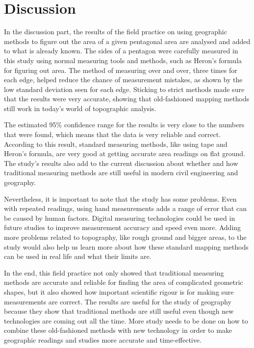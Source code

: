 \documentclass[12pt]{report}
\begin{document}
\newpage
\section*{Discussion}


In the discussion part, the results of the field practice on using geographic methods to figure out the area of a given pentagonal area are analysed and added to what is already known. The sides of a pentagon were carefully measured in this study using normal measuring tools and methods, such as Heron's formula for figuring out area. The method of measuring over and over, three times for each edge, helped reduce the chance of measurement mistakes, as shown by the low standard deviation seen for each edge. Sticking to strict methods made sure that the results were very accurate, showing that old-fashioned mapping methods still work in today's world of topographic analysis.

The estimated 95\% confidence range for the results is very close to the numbers that were found, which means that the data is very reliable and correct. According to this result, standard measuring methods, like using tape and Heron's formula, are very good at getting accurate area readings on flat ground. The study's results also add to the current discussion about whether and how traditional measuring methods are still useful in modern civil engineering and geography.

Nevertheless, it is important to note that the study has some problems. Even with repeated readings, using hand measurements adds a range of error that can be caused by human factors. Digital measuring technologies could be used in future studies to improve measurement accuracy and speed even more. Adding more problems related to topography, like rough ground and bigger areas, to the study would also help us learn more about how these standard mapping methods can be used in real life and what their limits are.

In the end, this field practice not only showed that traditional measuring methods are accurate and reliable for finding the area of complicated geometric shapes, but it also showed how important scientific rigour is for making sure measurements are correct. The results are useful for the study of geography because they show that traditional methods are still useful even though new technologies are coming out all the time. More study needs to be done on how to combine these old-fashioned methods with new technology in order to make geographic readings and studies more accurate and time-effective.
\end{document}
